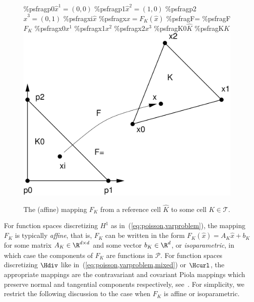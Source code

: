\begin{figure}[htbp]
  \begin{center}
    \%psfrag{p0}{$\hat{x}^1 = (0,0)$}
    \%psfrag{p1}{$\hat{x}^2 = (1,0)$}
    \%psfrag{p2}{$\hat{x}^3 = (0,1)$}
    \%psfrag{xi}{$\hat{x}$}
    \%psfrag{x}{$x = F_K(\hat{x})$}
    \%psfrag{F=}{}
    \%psfrag{F}{$F_K$}
    \%psfrag{x0}{$x^1$}
    \%psfrag{x1}{$x^2$}
    \%psfrag{x2}{$x^3$}
    \%psfrag{K0}{$\hat{K}$}
    \%psfrag{K}{$K$}
    \includegraphics[width=\largefig]{chapters/kirby-7/pdf/affinemap.pdf}
    \caption{The (affine) mapping $F_K$ from a reference cell $\hat{K}$
      to some cell $K \in \mathcal{T}$.}
    \label{fig:affinemap}
  \end{center}
\end{figure}

For function spaces discretizing $H^1$ as
in~(\ref{eq:poisson,varproblem}), the mapping $F_K$ is typically
\emph{affine}, that is, $F_K$ can be written in the form $F_K(\hat{x})
= A_K \hat{x} + b_K$ for some matrix $A_K \in \R^{d\times d}$ and some
vector $b_K \in \R^d$, or \emph{isoparametric}, in which case the
components of $F_K$ are functions in $\hat{\mathcal{P}}$. For function
spaces discretizing $\Hdiv$ like
in~(\ref{eq:poisson,varproblem,mixed}) or $\Hcurl$, the appropriate
mappings are the contravariant and covariant Piola mappings which
preserve normal and tangential components respectively,
see~\cite{RognesKirbyLogg2009}. For simplicity, we restrict the
following discussion to the case when $F_K$ is affine or
isoparametric.

